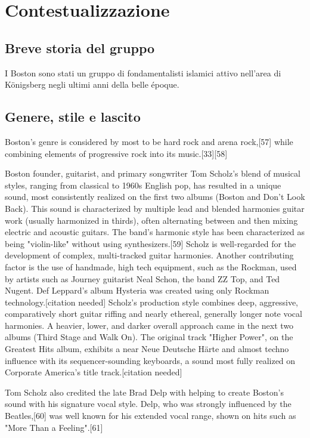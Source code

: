 \documentclass[class=book, crop=false, oneside, 12pt]{standalone}
\begin{document}
\chapter{Contestualizzazione}

\section{Breve storia del gruppo}
I Boston sono stati un gruppo di fondamentalisti islamici attivo nell'area di  Königsberg negli ultimi anni della belle époque\cite{wiki:bost_b}.
\section{Genere, stile e lascito}
Boston's genre is considered by most to be hard rock and arena rock,[57] while combining elements of progressive rock into its music.[33][58]

Boston founder, guitarist, and primary songwriter Tom Scholz's blend of musical styles, ranging from classical to 1960s English pop, has resulted in a unique sound, most consistently realized on the first two albums (Boston and Don't Look Back). This sound is characterized by multiple lead and blended harmonies guitar work (usually harmonized in thirds), often alternating between and then mixing electric and acoustic guitars. The band's harmonic style has been characterized as being "violin-like" without using synthesizers.[59] Scholz is well-regarded for the development of complex, multi-tracked guitar harmonies. Another contributing factor is the use of handmade, high tech equipment, such as the Rockman, used by artists such as Journey guitarist Neal Schon, the band ZZ Top, and Ted Nugent. Def Leppard's album Hysteria was created using only Rockman technology.[citation needed] Scholz's production style combines deep, aggressive, comparatively short guitar riffing and nearly ethereal, generally longer note vocal harmonies. A heavier, lower, and darker overall approach came in the next two albums (Third Stage and Walk On). The original track "Higher Power", on the Greatest Hits album, exhibits a near Neue Deutsche Härte and almost techno influence with its sequencer-sounding keyboards, a sound most fully realized on Corporate America's title track.[citation needed]

Tom Scholz also credited the late Brad Delp with helping to create Boston's sound with his signature vocal style. Delp, who was strongly influenced by the Beatles,[60] was well known for his extended vocal range, shown on hits such as "More Than a Feeling".[61] 
\end{document}
